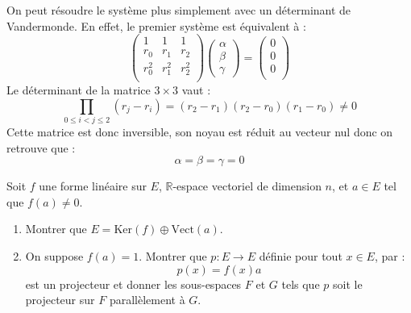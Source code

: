 \documentclass[a4paper,10pt]{report}
\begin{document}
\begin{enumerate}
\medskip

\noindent On peut résoudre le système plus simplement avec un déterminant de Vandermonde. En effet, le premier système est équivalent à :
$$ \begin{pmatrix}
1 & 1 & 1 \\
r_0 & r_1 & r_2 \\
r_0^2 & r_1^2 & r_2^2 \\
\end{pmatrix} \begin{pmatrix}
\alpha \\
\beta \\
\gamma
\end{pmatrix} = \begin{pmatrix}
0 \\
0 \\
0 \\
\end{pmatrix}$$ 
Le déterminant de la matrice $3 \times 3$ vaut :
$$ \prod_{0 \leq i <j \leq 2} (r_j-r_i) = (r_2-r_1)(r_2-r_0)(r_1-r_0) \neq 0$$
Cette matrice est donc inversible, son noyau est réduit au vecteur nul donc on retrouve que :
$$ \alpha = \beta = \gamma = 0$$
\end{enumerate}

\begin{Exa} Soit $f$ une forme linéaire sur $E$, $\mathbb{R}$-espace vectoriel de dimension $n$, et $a\in E$ tel que $f(a)\neq 0$.
\begin{enumerate}
\item Montrer que $E=\textrm{Ker}(f)\oplus\textrm{Vect}(a)$.
\item On suppose $f(a)=1$. Montrer que $p : E \rightarrow E$ définie pour tout $x \in E$, par :
$$ p(x) = f(x) a $$
est un projecteur et donner les sous-espaces $F$ et $G$ tels que $p$ soit le projecteur sur $F$ parallèlement à $G$.
\end{enumerate}
\end{Exa}

\corr 
\end{document}
